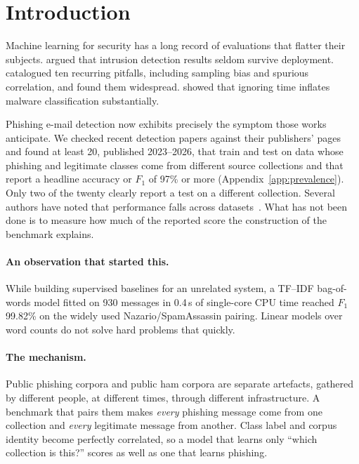 \documentclass[twoside,11pt]{article}
\begin{document}
\section{Introduction}

Machine learning for security has a long record of evaluations that flatter
their subjects. \citet{sommer2010} argued that intrusion
detection results seldom survive deployment. \citet{arp2022}
catalogued ten recurring pitfalls, including sampling bias and spurious
correlation, and found them widespread. \citet{pendlebury2019} showed that ignoring time inflates malware
classification substantially.

Phishing e-mail detection now exhibits precisely the symptom those works
anticipate. We checked recent detection papers against their publishers'
pages and found at least 20, published 2023--2026, that train and test on
data whose phishing and legitimate classes come from different source
collections and that report a headline accuracy or $F_1$ of 97\% or more
(Appendix~\ref{app:prevalence}). Only two of the twenty clearly report a test on
a different collection. Several authors have noted that performance falls
across datasets~\citep{indepth2025,meajor2025,pajola2025ephishgen,champa2025illusion}.
What has not been done is to measure how much of the reported score the
construction of the benchmark explains.

\paragraph{An observation that started this.}
While building supervised baselines for an unrelated system, a TF--IDF
bag-of-words model fitted on 930 messages in 0.4\,s of single-core CPU time
reached $F_1$ 99.82\% on the widely used Nazario/SpamAssassin pairing. Linear
models over word counts do not solve hard problems that quickly.

\paragraph{The mechanism.}
Public phishing corpora and public ham corpora are separate artefacts,
gathered by different people, at different times, through different
infrastructure. A benchmark that pairs them makes \emph{every} phishing
message come from one collection and \emph{every} legitimate message from
another. Class label and corpus identity become perfectly correlated, so a
model that learns only ``which collection is this?'' scores as well as one
that learns phishing.
\end{document}
